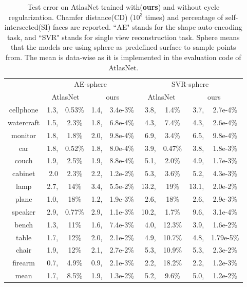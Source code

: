 \begin{table}
	\caption{Test error on AtlasNet trained with(\textbf{ours}) and without cycle regularization. Chamfer distance(CD) ($10^3$ times) and percentage of self-intersected(SI) faces are reported. ``AE" stands for the shape auto-encoding task, and ``SVR" stands for single view reconstruction task. Sphere means that the models are using sphere as predefined surface to sample points from. The mean is data-wise as it is implemented in the evaluation code of AtlasNet.}
	\label{tab:atlas}
	\centering
	\begin{tabular}{c|rc|rc|rc|rc|}
		\diagbox{Category}{CD,SI}{Model} &\multicolumn{4}{c|}{AE-sphere}&\multicolumn{4}{c|}{SVR-sphere}\\
		\cline{2-9}
		~& \multicolumn{2}{c|}{AtlasNet} & \multicolumn{2}{c|}{ours} & \multicolumn{2}{c|}{AtlasNet} & \multicolumn{2}{c|}{ours} \\
		\hline
		cellphone&1.3,&0.53\%&1.4,&3.4e-3\%&3.8,&1.4\%&3.7,&2.7e-4\%\\
		watercraft&1.5,&2.3\%&1.8,&6.8e-4\%&4.3,&7.4\%&4.3,&2.6e-4\%\\
		monitor&1.8,&1.8\%&2.0,&9.8e-4\%&6.9,&3.4\%&6.5,&9.8e-4\%\\
		car&1.8,&0.52\%&1.8,&8.0e-4\%&3.9,&0.47\%&3.8,&1.8e-3\%\\
		couch&1.9,&2.5\%&1.9,&8.8e-4\%&5.1,&2.0\%&4.9,&1.7e-3\%\\
		cabinet&2.0&2.3\%&2.2,&1.2e-2\%&5.3,&3.6\%&5.2,&4.3e-3\%\\
		lamp&2.7,&14\%&3.4,&5.5e-2\%&13.2,&19\%&13.1,&2.0e-2\%\\
		plane&1.0,&18\%&1.2,&1.9e-3\%&2.6,&18\%&2.6,&2.9e-3\%\\
		speaker&2.9,&0.77\%&2.9,&1.1e-3\%&10.2,&1.7\%&9.6,&3.1e-4\%\\
		bench&1.3,&11\%&1.6,&7.4e-3\%&4.0,&12.3\%&3.9,&1.6e-2\%\\
		table&1.7,&12\%&2.0,&2.1e-2\%&4.9,&10.7\%&4.8,&1.79e-5\%\\
		chair&1.9,&12\%&2.1,&2.7e-2\%&5.3,&10.9\%&5.3,&2.3e-2\%\\
		firearm&0.7,&4.9\%&0.9,&2.1e-3\%&2.2,&18.2\%&2.2,&1.2e-3\%\\
		\hline
		mean &1.7,&8.5\%&1.9,& 1.3e-2\% &5.2,&9.6\%&5.0,&1.2e-2\%\\
	\end{tabular}
\end{table}

